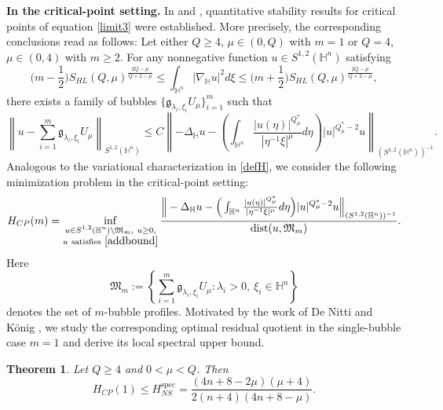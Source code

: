 \documentclass[11pt]{article}
\newtheorem{theorem}{Theorem}[section]
\begin{document}
{\bf In the critical-point setting.} In \cite[Theorems 1.9-1.10]{ZXW25} and \cite[Corollary 1.5]{CW26},
quantitative stability results for critical points of equation \eqref{limit3} were established. More precisely, the corresponding conclusions read as follows:
Let either $Q\geq4$, $\mu\in(0,Q)$ with $m=1$ or $Q=4$, $\mu\in(0,4)$ with $m\geq2$.
For any nonnegative function $u\in S^{1,2}(\mathbb{H}^{n})$ satisfying
\begin{equation}\label{addbound}
 \Big(m-\frac{1}{2}\Big)S_{HL}(Q,\mu)^{\frac{2Q-\mu}{Q+2-\mu}}\leq \int_{\mathbb{H}^{n}}|\nabla_{\mathbb{H}} u|^2d\xi
 \leq \Big(m+\frac{1}{2}\Big)S_{HL}(Q,\mu)^{\frac{2Q-\mu}{Q+2-\mu}},
\end{equation}
{there exists a family of bubbles $\{\mathfrak{g}_{\lambda_i,\xi_i}U_\mu\}_{i=1}^{m}$ such that}
\begin{equation*}
\left\|u-\sum\limits_{i=1}^m\mathfrak{g}_{\lambda_i,\xi_i}U_\mu\right\|_{S^{1,2}(\mathbb{H}^{n})} \leq C \left\|-\Delta_{\mathbb{H}}u-\left(\int_{\mathbb{H}^{n}}\frac{|u(\eta)|^{Q^{\ast}_{\mu}}}{|\eta^{-1}\xi|^{\mu}}{d}\eta\right)|u|^{Q^{\ast}_{\mu}-2}u\right\|_{(S^{1,2}(\mathbb{H}^{n}))^{-1}}.
\end{equation*}
Analogous to the variational characterization in \eqref{defH}, we consider the following minimization problem in the critical-point setting:
\begin{equation*}
 {H_{CP}(m)=\inf\limits_{\substack{u\in S^{1,2}(\mathbb{H}^{n})\setminus \mathfrak{M}_m,\ u\ge0,\\ u~\mathrm{satisfies}~\eqref{addbound}}}\frac{\Big\|-\Delta_{\mathbb{H}}u-\Big(\int_{\mathbb{H}^{n}}\frac{|u(\eta)|^{Q^{\ast}_{\mu}}}{|\eta^{-1}\xi|^{\mu}}{d}\eta\Big)
 |u|^{Q^{\ast}_{\mu}-2}u\Big\|_{(S^{1,2}(\mathbb{H}^{n}))^{-1}}}{\mathrm{dist}(u,\mathfrak{M}_m)}.}
\end{equation*}
{Here
\[
\mathfrak{M}_m:=\left\{\sum_{i=1}^{m}\mathfrak{g}_{\lambda_i,\xi_i}U_\mu:\lambda_i>0,\ \xi_i\in\mathbb{H}^{n}\right\}
\]
denotes the set of $m$-bubble profiles.} {Motivated by the work of De Nitti and K\"{o}nig \cite{DK23}, we study the corresponding optimal residual quotient in the single-bubble case $m=1$ and derive its local spectral upper bound.}



\begin{theorem}\label{addthm}
\begingroup
Let $Q\ge4$ and $0<\mu<Q$. Then
\begin{equation}\label{CP-nonstrict}
H_{CP}(1)\le H_{NS}^{\mathrm{spec}}
=\frac{(4n+8-2\mu)(\mu+4)}{2(n+4)(4n+8-\mu)}.
\end{equation}
\endgroup
\end{theorem}
\end{document}
